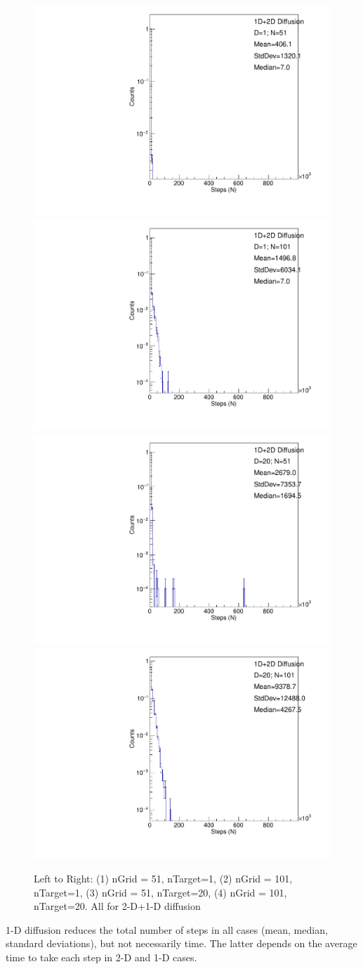 \documentclass{article}
\begin{document}
\begin{figure}[H]
    \centering
    \includegraphics[width=.24\textwidth]{stepsToTargetAttach_nSize51_D1.pdf} 
    \includegraphics[width=.24\textwidth]{stepsToTargetAttach_nSize101_D1.pdf} 
    \includegraphics[width=.24\textwidth]{stepsToTargetAttach_nSize51_D20.pdf} 
    \includegraphics[width=.24\textwidth]{stepsToTargetAttach_nSize101_D20.pdf} 
    \caption{Left to Right: (1) nGrid = 51, nTarget=1, (2) nGrid = 101, nTarget=1, (3) nGrid = 51, nTarget=20, (4) nGrid = 101, nTarget=20. All for 2-D+1-D diffusion}
    \label{fig2}
\end{figure}

1-D diffusion reduces the total number of steps in all cases (mean, median, standard deviations), but not necessarily time. The latter depends on the average time to take each step in 2-D and 1-D cases.
\end{document}
